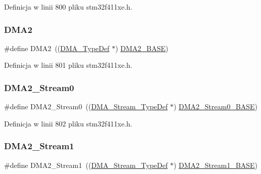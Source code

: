 Definicja w linii 800 pliku stm32f411xe.\+h.

\mbox{\label{group___peripheral__declaration_ga506520140eec1708bc7570c49bdf972d}} 
\subsubsection{\texorpdfstring{D\+M\+A2}{DMA2}}
{\footnotesize\ttfamily \#define D\+M\+A2~((\hyperlink{struct_d_m_a___type_def}{D\+M\+A\+\_\+\+Type\+Def} $\ast$) \hyperlink{group___peripheral__memory__map_gab72a9ae145053ee13d1d491fb5c1df64}{D\+M\+A2\+\_\+\+B\+A\+SE})}



Definicja w linii 801 pliku stm32f411xe.\+h.

\mbox{\label{group___peripheral__declaration_ga3a2efe5fd7a7a79be3b08a1670bbd016}} 
\subsubsection{\texorpdfstring{D\+M\+A2\+\_\+\+Stream0}{DMA2\_Stream0}}
{\footnotesize\ttfamily \#define D\+M\+A2\+\_\+\+Stream0~((\hyperlink{struct_d_m_a___stream___type_def}{D\+M\+A\+\_\+\+Stream\+\_\+\+Type\+Def} $\ast$) \hyperlink{group___peripheral__memory__map_gac4c67b24726ba6b94d03adb351bcec4d}{D\+M\+A2\+\_\+\+Stream0\+\_\+\+B\+A\+SE})}



Definicja w linii 802 pliku stm32f411xe.\+h.

\mbox{\label{group___peripheral__declaration_gae96f15d34d3c41c16fce69bc2878151a}} 
\subsubsection{\texorpdfstring{D\+M\+A2\+\_\+\+Stream1}{DMA2\_Stream1}}
{\footnotesize\ttfamily \#define D\+M\+A2\+\_\+\+Stream1~((\hyperlink{struct_d_m_a___stream___type_def}{D\+M\+A\+\_\+\+Stream\+\_\+\+Type\+Def} $\ast$) \hyperlink{group___peripheral__memory__map_ga35512bdc3f5e9df4557c2fbe7935d0b1}{D\+M\+A2\+\_\+\+Stream1\+\_\+\+B\+A\+SE})}



